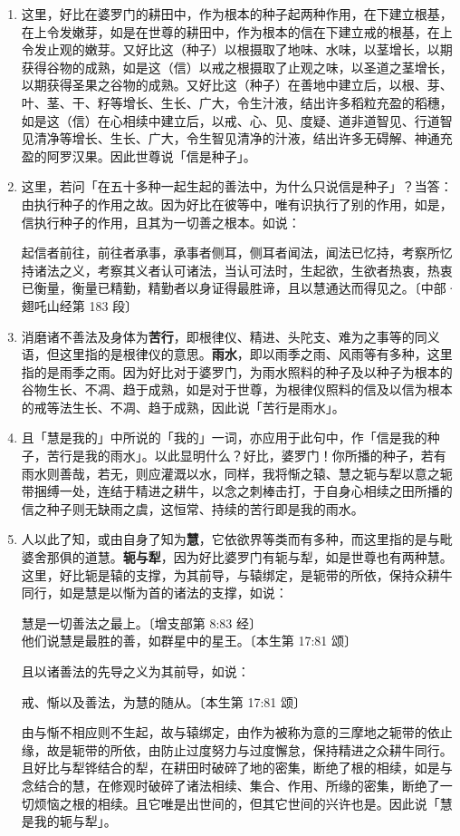 \begin{enumerate}
\item 这里，好比在婆罗门的耕田中，作为根本的种子起两种作用，在下建立根基，在上令发嫩芽，如是在世尊的耕田中，作为根本的信在下建立戒的根基，在上令发止观的嫩芽。又好比这（种子）以根摄取了地味、水味，以茎增长，以期获得谷物的成熟，如是这（信）以戒之根摄取了止观之味，以圣道之茎增长，以期获得圣果之谷物的成熟。又好比这（种子）在善地中建立后，以根、芽、叶、茎、干、籽等增长、生长、广大，令生汁液，结出许多稻粒充盈的稻穗，如是这（信）在心相续中建立后，以戒、心、见、度疑、道非道智见、行道智见清净等增长、生长、广大，令生智见清净的汁液，结出许多无碍解、神通充盈的阿罗汉果。因此世尊说「信是种子」。
\item 这里，若问「在五十多种一起生起的善法中，为什么只说信是种子」？当答：由执行种子的作用之故。因为好比在彼等中，唯有识执行了别的作用，如是，信执行种子的作用，且其为一切善之根本。如说：\begin{quoting}起信者前往，前往者承事，承事者侧耳，侧耳者闻法，闻法已忆持，考察所忆持诸法之义，考察其义者认可诸法，当认可法时，生起欲，生欲者热衷，热衷已衡量，衡量已精勤，精勤者以身证得最胜谛，且以慧通达而得见之。{\bluefootnotesize 〔中部·翅吒山经第 183 段〕}\end{quoting}
\item 消磨诸不善法及身体为\textbf{苦行}，即根律仪、精进、头陀支、难为之事等的同义语，但这里指的是根律仪的意思。\textbf{雨水}，即以雨季之雨、风雨等有多种，这里指的是雨季之雨。因为好比对于婆罗门，为雨水照料的种子及以种子为根本的谷物生长、不凋、趋于成熟，如是对于世尊，为根律仪照料的信及以信为根本的戒等法生长、不凋、趋于成熟，因此说「苦行是雨水」。
\item 且「慧是我的」中所说的「我的」一词，亦应用于此句中，作「信是我的种子，苦行是我的雨水」。以此显明什么？好比，婆罗门！你所播的种子，若有雨水则善哉，若无，则应灌溉以水，同样，我将惭之辕、慧之轭与犁以意之轭带捆缚一处，连结于精进之耕牛，以念之刺棒击打，于自身心相续之田所播的信之种子则无缺雨之虞，这恒常、持续的苦行即是我的雨水。
\item 人以此了知，或由自身了知为\textbf{慧}，它依欲界等类而有多种，而这里指的是与毗婆舍那俱的道慧。\textbf{轭与犁}，因为好比婆罗门有轭与犁，如是世尊也有两种慧。这里，好比轭是辕的支撑，为其前导，与辕绑定，是轭带的所依，保持众耕牛同行，如是慧是以惭为首的诸法的支撑，如说：\begin{quoting}慧是一切善法之最上。{\bluefootnotesize 〔增支部第 8:83 经〕}\\他们说慧是最胜的善，如群星中的星王。{\bluefootnotesize 〔本生第 17:81 颂〕}\end{quoting}且以诸善法的先导之义为其前导，如说：\begin{quoting}戒、惭以及善法，为慧的随从。{\bluefootnotesize 〔本生第 17:81 颂〕}\end{quoting}由与惭不相应则不生起，故与辕绑定，由作为被称为意的三摩地之轭带的依止缘，故是轭带的所依，由防止过度努力与过度懈怠，保持精进之众耕牛同行。且好比与犁铧结合的犁，在耕田时破碎了地的密集，断绝了根的相续，如是与念结合的慧，在修观时破碎了诸法相续、集合、作用、所缘的密集，断绝了一切烦恼之根的相续。且它唯是出世间的，但其它世间的兴许也是。因此说「慧是我的轭与犁」。

\end{enumerate}
